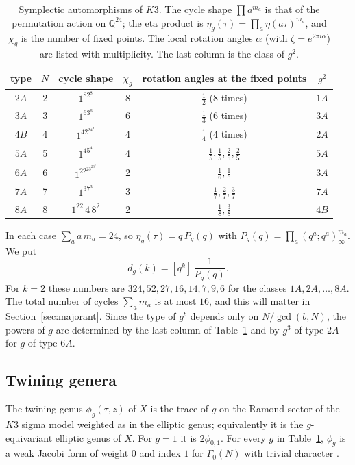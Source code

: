 \documentclass[11pt]{amsart}
\theoremstyle{definition}
\newcommand{\QQ}{\mathbb{Q}}
\begin{document}
\begin{table}[H]
\centering
\caption{Symplectic automorphisms of $K3$. The cycle shape $\prod a^{m_a}$ is that of the permutation action on $\QQ^{24}$; the eta product is $\eta_g(\tau)=\prod_a\eta(a\tau)^{m_a}$, and $\chi_g$ is the number of fixed points. The local rotation angles $\alpha$ (with $\zeta=e^{2\pi i\alpha}$) are listed with multiplicity. The last column is the class of $g^2$.}
\label{tab:classes}
\renewcommand{\arraystretch}{1.15}
\begin{tabular}{cccccc}
\toprule
type & $N$ & cycle shape & $\chi_g$ & rotation angles at the fixed points & $g^2$\\
\midrule
$2A$ & 2 & $1^82^8$ & 8 & $\tfrac12$ ($8$ times) & $1A$\\
$3A$ & 3 & $1^63^6$ & 6 & $\tfrac13$ ($6$ times) & $3A$\\
$4B$ & 4 & $1^42^24^4$ & 4 & $\tfrac14$ ($4$ times) & $2A$\\
$5A$ & 5 & $1^45^4$ & 4 & $\tfrac15,\tfrac15,\tfrac25,\tfrac25$ & $5A$\\
$6A$ & 6 & $1^22^23^26^2$ & 2 & $\tfrac16,\tfrac16$ & $3A$\\
$7A$ & 7 & $1^37^3$ & 3 & $\tfrac17,\tfrac27,\tfrac37$ & $7A$\\
$8A$ & 8 & $1^22\,4\,8^2$ & 2 & $\tfrac18,\tfrac38$ & $4B$\\
\bottomrule
\end{tabular}
\end{table}

In each case $\sum_a a\,m_a=24$, so $\eta_g(\tau)=q\,P_g(q)$ with $P_g(q)=\prod_a(q^a;q^a)_\infty^{m_a}$. We put
\[
d_g(k)=[q^k]\,\frac{1}{P_g(q)}.
\]
For $k=2$ these numbers are $324,52,27,16,14,7,9,6$ for the classes $1A,2A,\dots,8A$. The total number of cycles $\sum_a m_a$ is at most $16$, and this will matter in Section~\ref{sec:majorant}. Since the type of $g^b$ depends only on $N/\gcd(b,N)$, the powers of $g$ are determined by the last column of Table~\ref{tab:classes} and by $g^3$ of type $2A$ for $g$ of type $6A$.

\subsection{Twining genera}
The twining genus $\phi_g(\tau,z)$ of $X$ is the trace of $g$ on the Ramond sector of the $K3$ sigma model weighted as in the elliptic genus; equivalently it is the $g$-equivariant elliptic genus of $X$. For $g=1$ it is $2\phi_{0,1}$. For every $g$ in Table~\ref{tab:classes}, $\phi_g$ is a weak Jacobi form of weight $0$ and index $1$ for $\Gamma_0(N)$ with trivial character \cite{Che10,GHV10}.
\end{document}
